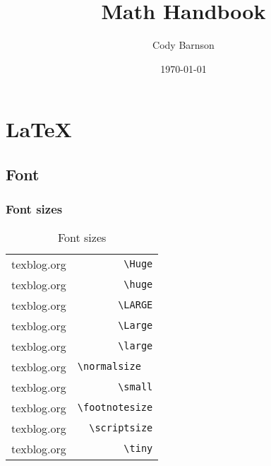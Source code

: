 \documentclass{article}
\begin{document}
\title{Math Handbook}
\author{Cody Barnson}
\date{\today}
\maketitle

\renewcommand\listoflistingscaption{Code segments}


\renewcommand\listingscaption{Code snippet}

{}




\section{\LaTeX}
\subsection{Font}
\subsubsection{Font sizes}
\begin{table}[H]
    \centering
    \begin{tabular}[]{lr}
        \Huge{texblog.org}         & \verb|\Huge|  \\
        \huge{texblog.org}         & \verb|\huge|  \\
        \LARGE{texblog.org}        & \verb|\LARGE|  \\
        \Large{texblog.org}        & \verb|\Large|  \\
        \large{texblog.org}        & \verb|\large|  \\
        \normalsize  {texblog.org} & \verb|\normalsize  |  \\
        \small{texblog.org}        & \verb|\small|  \\
        \footnotesize{texblog.org} & \verb|\footnotesize|  \\
        \scriptsize{texblog.org}   & \verb|\scriptsize|  \\
        \tiny{texblog.org}         & \verb|\tiny| \\
    \end{tabular}
    \caption{Font sizes}
    \label{tab:1}
\end{table}
\end{document}
